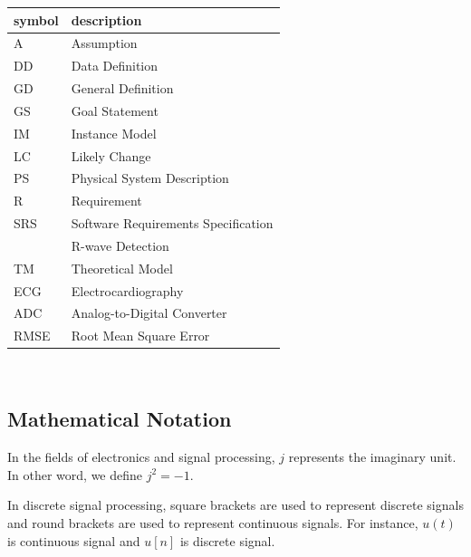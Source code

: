 \documentclass[12pt]{article}
\begin{document}
\renewcommand{\arraystretch}{1.2}
\begin{tabular}{l l} 
  \toprule		
  \textbf{symbol} & \textbf{description}\\
  \midrule 
  A & Assumption\\
  DD & Data Definition\\
  GD & General Definition\\
  GS & Goal Statement\\
  IM & Instance Model\\
  LC & Likely Change\\
  PS & Physical System Description\\
  R & Requirement\\
  SRS & Software Requirements Specification\\
  \progname{} & R-wave Detection\\
  TM & Theoretical Model\\
  ECG & Electrocardiography\\
  ADC & Analog-to-Digital Converter \\
  RMSE & Root Mean Square Error\\
  \bottomrule
\end{tabular}\\


\subsection{Mathematical Notation}

In the fields of electronics and signal processing, $j$ represents the imaginary
unit. In other word, we define $j^2 = -1$.

In discrete signal processing, square brackets are used to represent discrete
signals and round brackets are used to represent continuous signals.  For
instance, $u(t)$ is continuous signal and $u[n]$ is discrete signal.

\newpage


\end{document}
